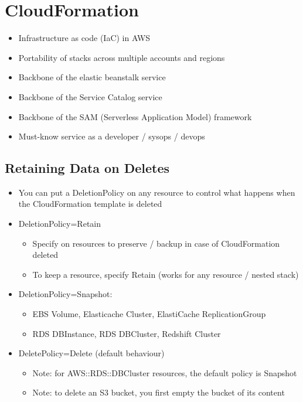 \section{CloudFormation}
\begin{itemize}
    \item Infrastructure as code (IaC) in AWS
    \item Portability of stacks across multiple accounts and regions
    \item Backbone of the elastic beanstalk service
    \item Backbone of the Service Catalog service
    \item Backbone of the SAM (Serverless Application Model) framework
    \item Must-know service as a developer / sysops / devops
\end{itemize}

\subsection{Retaining Data on Deletes}
\begin{itemize}
    \item You can put a DeletionPolicy on any resource to control what happens when the CloudFormation template is deleted
    \item DeletionPolicy=Retain
    \begin{itemize}
        \item Specify on resources to preserve / backup in case of CloudFormation deleted
        \item To keep a resource, specify Retain (works for any resource / nested stack)
    \end{itemize}
    \item DeletionPolicy=Snapshot:
    \begin{itemize}
        \item EBS Volume, Elasticache Cluster, ElastiCache ReplicationGroup
        \item RDS DBInstance, RDS DBCluster, Redshift Cluster
    \end{itemize}
    \item DeletePolicy=Delete (default behaviour)
    \begin{itemize}
        \item Note: for AWS::RDS::DBCluster resources, the default policy is Snapshot
        \item Note: to delete an S3 bucket, you first empty the bucket of its content
    \end{itemize}
\end{itemize}

